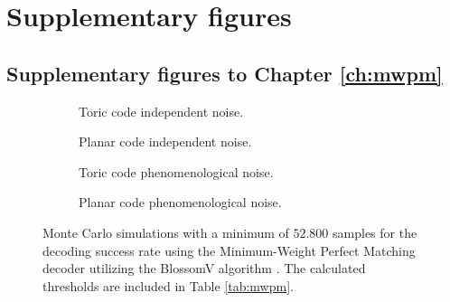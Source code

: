 \chapter{Supplementary figures}
\section{Supplementary figures to Chapter \ref{ch:mwpm}}\label{ap:figmwpm}

\begin{figure}[htbp]
    \centering
    \begin{subfigure}[b]{0.49\textwidth}
      \begin{adjustbox}{Clip=0 1em 0 0}
        
      \end{adjustbox}
      \caption{Toric code independent noise.}
    \end{subfigure}
    \begin{subfigure}[b]{0.49\textwidth}
      \begin{adjustbox}{Clip=0 1em 0 0}
        
      \end{adjustbox}
      \caption{Planar code independent noise.}
    \end{subfigure}
    \begin{subfigure}[b]{0.49\textwidth}
      \begin{adjustbox}{Clip=0 1em 0 0}
        
      \end{adjustbox}
      \caption{Toric code phenomenological noise.}
    \end{subfigure}
    \begin{subfigure}[b]{0.49\textwidth}
      \begin{adjustbox}{Clip=0 1em 0 0}
        
      \end{adjustbox}
      \caption{Planar code phenomenological noise.}
    \end{subfigure}
    \caption{Monte Carlo simulations with a minimum of $52.800$ samples for the decoding success rate using the Minimum-Weight Perfect Matching decoder utilizing the BlossomV algorithm \cite{kolmogorov2009blossom}. The calculated thresholds are included in Table \ref{tab:mwpm}.}
    \label{fig:threshold_mwpm}
  \end{figure}
